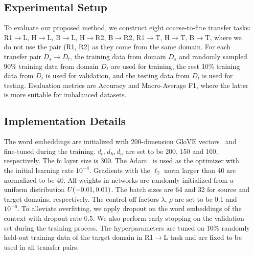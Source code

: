 \documentclass[letterpaper]{article} \usepackage{aaai19}  \usepackage{times}  \usepackage{latexsym}
\begin{document}
\subsection{Experimental Setup}
\vspace{-0.5mm}
To evaluate our proposed method, we construct eight coarse-to-fine transfer tasks: R1$\rightarrow$L, H$\rightarrow$L, B$\rightarrow$L, H$\rightarrow$R2, B$\rightarrow$R2, R1$\rightarrow$T, H$\rightarrow$T, B$\rightarrow$T,  where we do not use the pair (R1, R2) as they come from the same domain. For each transfer pair $D_{s}$$\rightarrow$$D_{t}$, the training data from domain $D_{s}$ and randomly sampled 90\% training data from domain $D_{t}$ are used for training, the rest 10\% training data from $D_{t}$ is used for validation, and the testing data from $D_{t}$ is used for testing. Evaluation metrics are Accuracy and Macro-Average F1, where the latter is more suitable for imbalanced datasets.

\vspace{-1mm}
\subsection{Implementation Details}
\vspace{-0.5mm}
The word embeddings are initialized with 200-dimension GloVE vectors~\cite{pennington2014glove} and fine-tuned during the training. $d_{e},d_{h},d_{u}$ are set to be 200, 150 and 100, respectively. The fc layer size is 300. The Adam~\cite{kingma2014adam} is used as the optimizer with the initial learning rate $10^{-4}$. Gradients with the $\ell_2$ norm larger than 40 are normalized to be 40. All weights in networks are randomly initialized from a uniform distribution $\small{U(-0.01,0.01)}$. The batch sizes are 64 and 32 for source and target domains, respectively. The control-off factors $\lambda$, $\rho$ are set to be 0.1 and $10^{-6}$. To alleviate overfitting, we apply dropout on the word embeddings of the context with dropout rate 0.5. We also perform early stopping on the validation set during the training process. The hyperparameters are tuned on 10\% randomly held-out training data of the target domain in R1$\rightarrow$L task and are fixed to be used in all transfer pairs.
\end{document}
